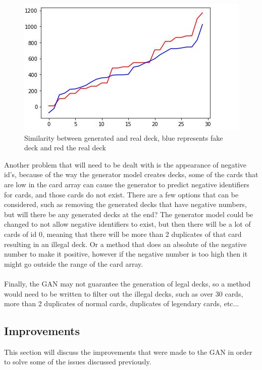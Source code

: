 \documentclass{report} %
\begin{document}
\begin{figure}[H]
\centering
\includegraphics[width=1\textwidth]{initialTraining}
\caption{Similarity between generated and real deck, blue represents fake deck and red the real deck \protect}
 \label{board}
\end{figure}

Another problem that will need to be dealt with is the appearance of negative id's, because of the way the generator model creates decks, some of the cards that are low in the card array can cause the generator to predict negative identifiers for cards, and those cards do not exist. There are a few options that can be considered, such as removing the generated decks that have negative numbers, but will there be any generated decks at the end? The generator model could be changed to not allow negative identifiers to exist, but then there will be a lot of cards of id 0, meaning that there will be more than 2 duplicates of that card resulting in an illegal deck. Or a method that does an absolute of the negative number to make it positive, however if the negative number is too high then it might go outside the range of the card array.\\ \\
Finally, the GAN may not guarantee the generation of legal decks, so a method would need to be written to filter out the illegal decks, such as over 30 cards, more than 2 duplicates of normal cards, duplicates of legendary cards, etc...

\subsection{Improvements}
This section will discuss the improvements that were made to the GAN in order to solve some of the issues discussed previously.
\end{document}
